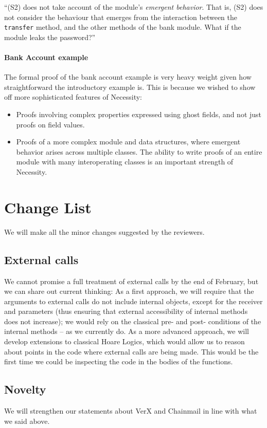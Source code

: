 \documentclass[11pt]{amsart}
\begin{document}
``(S2) does not take account of the module's \emph{emergent behavior}. That is, (S2) does not consider the behaviour that emerges from the interaction between the 
\texttt{transfer} method, and the other methods of the bank module. What if the module leaks the password?''

\paragraph{\textbf{Bank Account example}} The formal proof of the bank account example is very heavy weight given how straightforward the introductory example is. 
This is because we wished to show off more sophisticated features of Necessity:
\begin{itemize}
\item
Proofs involving complex properties expressed using ghost fields, and not just proofs on field values.
\item
Proofs of a more complex module and data structures, where emergent behavior arises across multiple 
classes. The ability to write proofs of an entire module with many interoperating classes is an important strength of Necessity.
\end{itemize}

 \section{Change List}
  We will make all the minor changes suggested by the reviewers.
 \subsection*{External calls}
 We cannot promise a full treatment of external calls by the end of February, but we can share out current thinking:  As a first approach, we will require that the arguments to external calls do not include internal objects, except for the receiver and parameters (thus ensuring that external accessibility of internal methods does not increase); we would rely on the classical pre- and post- conditions of the internal methods -- as we currently do. As a more advanced approach, we will develop extensions to classical Hoare Logics, which would allow us to reason about points in the code where external calls are being made. This would be the first time we could be inspecting the code in the bodies of the functions.
 \subsection*{Novelty}
 We will strengthen our statements about VerX and Chainmail in line with what we said above.
 
\end{document}
